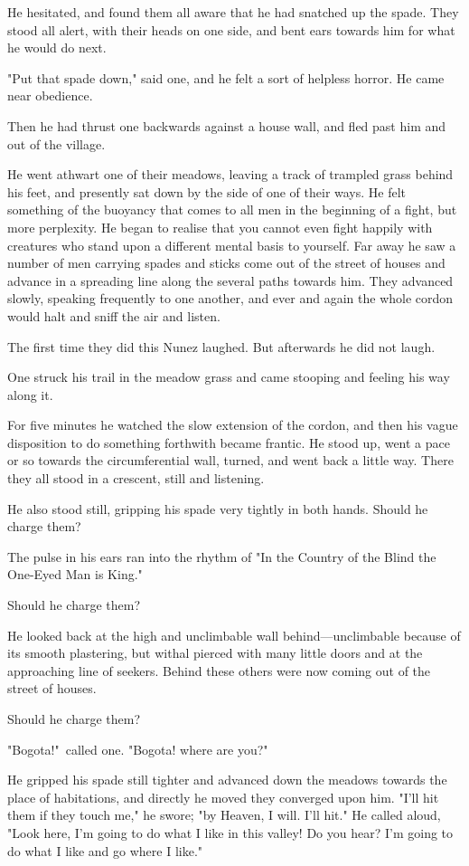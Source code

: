 \documentclass[courier]{sffms}
\begin{document}
He hesitated, and found them all aware that he had snatched up the
spade. They stood all alert, with their heads on one side, and bent
ears towards him for what he would do next.

"Put that spade down," said one, and he felt a sort of helpless
horror. He came near obedience.

Then he had thrust one backwards against a house wall, and fled past
him and out of the village.

He went athwart one of their meadows, leaving a track of trampled
grass behind his feet, and presently sat down by the side of one of
their ways. He felt something of the buoyancy that comes to all men in
the beginning of a fight, but more perplexity. He began to realise
that you cannot even fight happily with creatures who stand upon a
different mental basis to yourself. Far away he saw a number of men
carrying spades and sticks come out of the street of houses and
advance in a spreading line along the several paths towards him. They
advanced slowly, speaking frequently to one another, and ever and
again the whole cordon would halt and sniff the air and listen.

The first time they did this Nunez laughed. But afterwards he did not
laugh.

One struck his trail in the meadow grass and came stooping and feeling
his way along it.

For five minutes he watched the slow extension of the cordon, and then
his vague disposition to do something forthwith became frantic. He
stood up, went a pace or so towards the circumferential wall, turned,
and went back a little way.  There they all stood in a crescent, still
and listening.

He also stood still, gripping his spade very tightly in both
hands. Should he charge them?

The pulse in his ears ran into the rhythm of "In the Country of the
Blind the One-Eyed Man is King."

Should he charge them?

He looked back at the high and unclimbable wall behind---unclimbable
because of its smooth plastering, but withal pierced with many little
doors and at the approaching line of seekers. Behind these others were
now coming out of the street of houses.

Should he charge them?

"Bogota!"\ called one. "Bogota! where are you?"

He gripped his spade still tighter and advanced down the meadows
towards the place of habitations, and directly he moved they converged
upon him. "I'll hit them if they touch me," he swore; "by Heaven, I
will. I'll hit." He called aloud, "Look here, I'm going to do what I
like in this valley! Do you hear? I'm going to do what I like and go
where I like."
\end{document}
